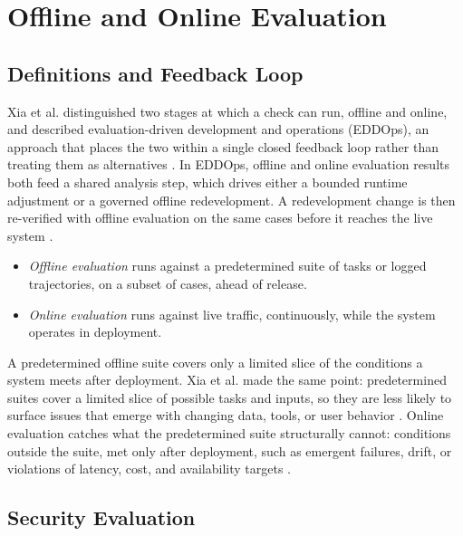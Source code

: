 \section{Offline and Online Evaluation}
\label{sec:offline-online-evaluation}

\subsection{Definitions and Feedback Loop}
\label{sec:offline-online-definitions}

Xia et al. distinguished two stages at which a check can run, offline and online, and described evaluation-driven development and operations (EDDOps), an approach that places the two within a single closed feedback loop rather than treating them as alternatives \cite{xiaEvaluationDrivenDevelopmentOperations2025}. In EDDOps, offline and online evaluation results both feed a shared analysis step, which drives either a bounded runtime adjustment or a governed offline redevelopment. A redevelopment change is then re-verified with offline evaluation on the same cases before it reaches the live system \cite{xiaEvaluationDrivenDevelopmentOperations2025}.

\begin{itemize}
    \item \emph{Offline evaluation} runs against a predetermined suite of tasks or logged trajectories, on a subset of cases, ahead of release.
    \item \emph{Online evaluation} runs against live traffic, continuously, while the system operates in deployment.
\end{itemize}

A predetermined offline suite covers only a limited slice of the conditions a system meets after deployment. Xia et al. made the same point: predetermined suites cover a limited slice of possible tasks and inputs, so they are less likely to surface issues that emerge with changing data, tools, or user behavior \cite{xiaEvaluationDrivenDevelopmentOperations2025}. Online evaluation catches what the predetermined suite structurally cannot: conditions outside the suite, met only after deployment, such as emergent failures, drift, or violations of latency, cost, and availability targets \cite{xiaEvaluationDrivenDevelopmentOperations2025}.

\subsection{Security Evaluation}
\label{sec:security-evaluation}

